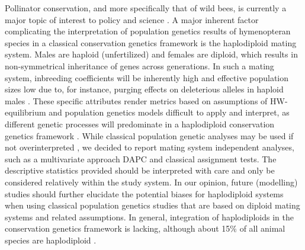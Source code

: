 \documentclass[10pt, twoside]{book} %
\begin{document}
	Pollinator conservation, and more specifically that of wild bees, is currently a major topic of interest to policy and science \citep{potts2016}. A major inherent factor complicating the interpretation of population genetics results of hymenopteran species in a classical conservation genetics framework is the haplodiploid mating system. Males are haploid (unfertilized) and females are diploid, which results in non-symmetrical inheritance of genes across generations. In such a mating system, inbreeding coefficients will be inherently high and effective population sizes low due to, for instance, purging effects on deleterious alleles in haploid males \citep{zayed2004, zayed2009}. These specific attributes render metrics based on assumptions of HW-equilibrium and population genetics models difficult to apply and interpret, as different genetic processes will predominate in a haplodiploid conservation genetics framework \citep{zayed2009}. While classical population genetic analyses may be used if not overinterpreted \citep{cerna2013, sanllorente2015}, we decided to report mating system independent analyses, such as a multivariate approach DAPC and classical assignment tests. The descriptive statistics provided should be interpreted with care and only be considered relatively within the study system. In our opinion, future (modelling) studies should further elucidate the potential biases for haplodiploid systems when using classical population genetics studies that are based on diploid mating systems and related assumptions. In general, integration of haplodiploids in the conservation genetics framework is lacking, although about 15$\%$ of all animal species are haplodiploid \citep{evans2004, lohse2015}.\\
	
\end{document}
